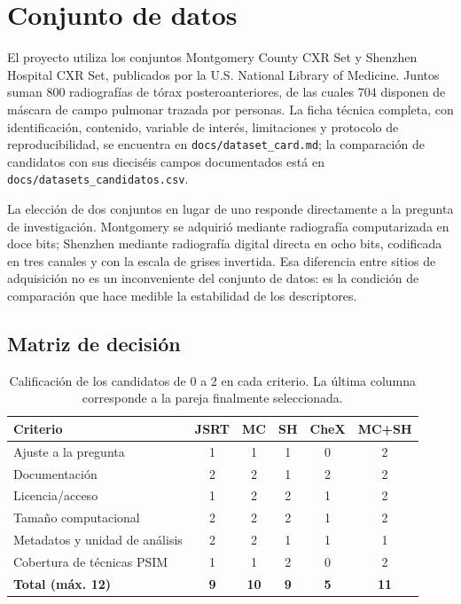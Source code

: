 \documentclass[12pt,a4paper]{article}
\begin{document}
\section{Conjunto de datos}

El proyecto utiliza los conjuntos Montgomery County CXR Set y Shenzhen Hospital
CXR Set, publicados por la U.S. National Library of Medicine. Juntos suman 800
radiografías de tórax posteroanteriores, de las cuales 704 disponen de máscara de
campo pulmonar trazada por personas. La ficha técnica completa, con identificación,
contenido, variable de interés, limitaciones y protocolo de reproducibilidad, se
encuentra en \texttt{docs/dataset\_card.md}; la comparación de candidatos con sus
dieciséis campos documentados está en \texttt{docs/datasets\_candidatos.csv}.

La elección de dos conjuntos en lugar de uno responde directamente a la pregunta
de investigación. Montgomery se adquirió mediante radiografía computarizada en doce
bits; Shenzhen mediante radiografía digital directa en ocho bits, codificada en tres
canales y con la escala de grises invertida. Esa diferencia entre sitios de
adquisición no es un inconveniente del conjunto de datos: es la condición de
comparación que hace medible la estabilidad de los descriptores.

\subsection{Matriz de decisión}

\begin{table}[H]
\centering
\caption{Calificación de los candidatos de 0 a 2 en cada criterio. La última columna
corresponde a la pareja finalmente seleccionada.}
\small
\begin{tabular}{@{}p{4.3cm}ccccc@{}}
\toprule
\textbf{Criterio} & \textbf{JSRT} & \textbf{MC} & \textbf{SH} & \textbf{CheX} & \textbf{MC+SH} \\
\midrule
Ajuste a la pregunta            & 1 & 1 & 1 & 0 & 2 \\
Documentación                   & 2 & 2 & 1 & 2 & 2 \\
Licencia/acceso                 & 1 & 2 & 2 & 1 & 2 \\
Tamaño computacional            & 2 & 2 & 2 & 1 & 2 \\
Metadatos y unidad de análisis  & 2 & 2 & 1 & 1 & 1 \\
Cobertura de técnicas PSIM      & 1 & 1 & 2 & 0 & 2 \\
\midrule
\textbf{Total (máx. 12)}        & \textbf{9} & \textbf{10} & \textbf{9} & \textbf{5} & \textbf{11} \\
\bottomrule
\end{tabular}
\end{table}
\end{document}
